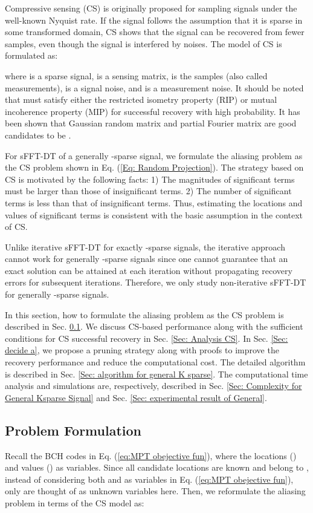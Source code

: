 \documentclass[journal,onecolumn,11pt]{IEEEtran}
\begin{document}
Compressive sensing (CS) is originally proposed for sampling signals under the well-known Nyquist rate.
If the signal follows the assumption that it is sparse in some transformed domain, CS shows that the signal can be recovered from fewer samples, even though the signal is interfered by noises.
The model of CS is formulated as:

where  is a sparse signal,  is a sensing matrix,  is the samples (also called measurements),  is a signal noise, and  is a measurement noise.
It should be noted that  must satisfy either the restricted isometry property (RIP) \cite{Candes2005}\cite{Gan2009} or mutual incoherence property (MIP) \cite{Donoho2001}\cite{Welch1974} for successful recovery with high probability.
It has been shown that Gaussian random matrix and partial Fourier matrix \cite{Candes2006-F} are good candidates to be .

For sFFT-DT of a generally -sparse signal, we formulate the aliasing problem as the CS problem shown in Eq. (\ref{Eq: Random Projection}).
The strategy based on CS is motivated by the following facts:
1) The magnitudes of significant terms must be larger than those of insignificant terms.
2) The number of significant terms is less than that of insignificant terms.
Thus, estimating the locations and values of significant terms is
consistent with the basic assumption in the context of CS.

Unlike iterative sFFT-DT for exactly -sparse signals, the iterative approach cannot work for generally -sparse signals since one cannot guarantee that an exact solution can be attained at each iteration without propagating recovery errors for subsequent iterations.
Therefore, we only study non-iterative sFFT-DT for generally -sparse signals.

In this section, how to formulate the aliasing problem as the CS problem is described in Sec. \ref{Sec: Refinement}.
We discuss CS-based performance along with the sufficient conditions for CS successful recovery in Sec. \ref{Sec: Analysis CS}.
In Sec. \ref{Sec: decide a}, we propose a pruning strategy along with proofs to improve the recovery performance and reduce the computational cost.
The detailed algorithm is described in Sec. \ref{Sec: algorithm for general K sparse}.
The computational time analysis and simulations are, respectively, described in Sec. \ref{Sec: Complexity  for General Ksparse Signal} and Sec. \ref{Sec: experimental result of General}.



\subsection{Problem Formulation}\label{Sec: Refinement}
Recall the BCH codes in Eq. (\ref{eq:MPT obejective fun}), where the locations () and values () as variables.
Since all candidate locations are known and belong to , instead of considering both  and  as variables in Eq. (\ref{eq:MPT obejective fun}), only  are thought of as unknown variables here.
Then, we reformulate the aliasing problem in terms of the CS model as:
\small
\end{document}
